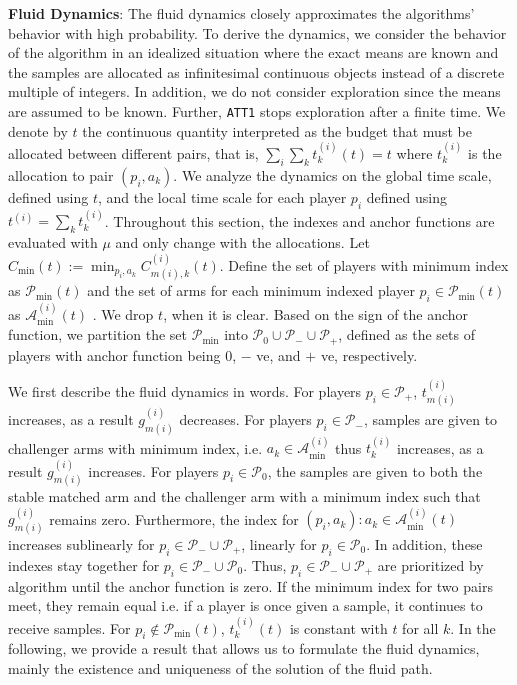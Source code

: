 \documentclass{article}
\begin{document}
\textbf{Fluid Dynamics}: The fluid dynamics closely approximates the algorithms' behavior with high probability.  To derive the dynamics, we consider the behavior of the algorithm in an idealized situation where the exact means are known and the samples are allocated as infinitesimal continuous objects instead of a discrete multiple of integers. In addition, we do not consider exploration since the means are assumed to be known. Further, \texttt{ATT1} stops exploration after a finite time. We denote by $t$ the continuous quantity interpreted as the budget that must be allocated between different pairs, that is, $\sum_{i}\sum_{k}t^{(i)}_k(t)=t$ where $t^{(i)}_k$ is the allocation to pair $(p_i,a_k)$. We analyze the dynamics on the global time scale, defined using $t$, and the local time scale for each player $p_i$ defined using $t^{(i)}=\sum_{k}t^{(i)}_k$. Throughout this section, the indexes and anchor functions are evaluated with $\mu$ and only change with the allocations.
Let $C_{\min}(t):=\min_{p_i,a_k}C^{(i)}_{m(i),k}(t)$. Define the set of players with minimum index as $\mathcal{P}_{\min}(t)$
and the set of arms for each minimum indexed player $p_i\in \mathcal{P}_{\min}(t)$ as  $\mathcal{A}_{\min}^{(i)}(t)$
    . We drop $t$, when it is clear. Based on the sign of the anchor function, we partition the set $\mathcal{P}_{\min}$ into $\mathcal{P}_0\cup\mathcal{P}_{-}\cup\mathcal{P}_{+}$, defined as the sets of players with anchor function being $0$, $-$ ve, and $+$ ve, respectively.
    
We first describe the fluid dynamics in words.   For players $p_i\in  \mathcal{P}_{+}$, $t^{(i)}_{m(i)}$ increases, as a result $g^{(i)}_{m(i)}$ decreases. For players $p_i\in \mathcal{P}_{-}$, samples are given to challenger arms with minimum index, i.e. $a_k\in\mathcal{A}^{(i)}_{\min}$ thus $t^{(i)}_{k}$ increases, as a result $g^{(i)}_{m(i)}$ increases. For players $p_i\in  \mathcal{P}_{0}$, the samples are given to both the stable matched arm and the challenger arm with a minimum index such that $g^{(i)}_{m(i)}$ remains zero. Furthermore, the index for $(p_i,a_k):a_k\in\mathcal{A}^{(i)}_{\min}(t)$ increases sublinearly for $p_i\in\mathcal{P}_{-}\cup \mathcal{P}_{+}$, linearly for $p_i\in\mathcal{P}_{0}$. In addition, these indexes stay together for $p_i\in \mathcal{P}_{-}\cup\mathcal{P}_{0}$. Thus, $p_i\in\mathcal{P}_{-}\cup \mathcal{P}_{+}$  are prioritized by algorithm until the anchor function is zero.  If the minimum index for two pairs meet, they remain equal i.e. if a player is once given a sample, it continues to receive samples. For $p_i\not\in \mathcal{P}_{\min}(t)$, $t^{(i)}_{k}(t)$ is constant with $t$ for all $k$. In the following, we provide a result that allows us to formulate the fluid dynamics, mainly the existence and uniqueness of the solution of the fluid path.
\end{document}
